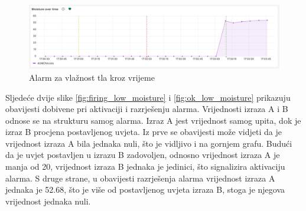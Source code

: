 \begin{figure}[ht]
	\centering
	\includegraphics[scale=0.4]{imgs/moisture_alert}
	\caption{Alarm za vlažnost tla kroz vrijeme}
	\label{fig:moisture_alert}
\end{figure}

Sljedeće dvije slike \ref{fig:firing_low_moisture} i \ref{fig:ok_low_moisture} prikazuju obavijesti dobivene pri aktivaciji i razrješenju alarma. Vrijednosti izraza A i B odnose se na strukturu samog alarma. Izraz A jest vrijednost samog upita, dok je izraz B procjena postavljenog uvjeta. Iz prve se obavijesti može vidjeti da je vrijednost izraza A bila jednaka nuli, što je vidljivo i na gornjem grafu. Budući da je uvjet postavljen u izrazu B zadovoljen, odnosno vrijednost izraza A je manja od 20, vrijednost izraza B jednaka je jedinici, što signalizira aktivaciju alarma. S druge strane, u obavijesti razrješenja alarma vrijednost izraza A jednaka je 52.68, što je više od postavljenog uvjeta izraza B, stoga je njegova vrijednost jednaka nuli. 


